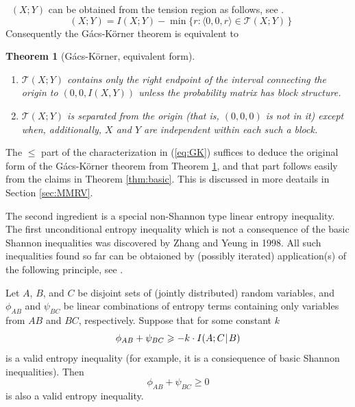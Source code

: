 \documentclass{IEEEtran}
\makeatletter
\def\correcthref{\hyper@anchor{\@currentHref}}
\newtheorem{theorem}{Theorem}
\newcommand\T{\mathcal{T}}
\DeclareMathOperator\GK{C_{\mathsf{GK}}}
\newcommand\I{I\xspace}
\def\|{\mkern 1.4mu\mathord{|}\mkern 1.4mu}
\renewcommand{\ge}{\geqslant}
\renewcommand{\le}{\leqslant}
\makeatother
\begin{document}
$\GK(X;Y)$ can be obtained from the tension region as follows, see
\cite[Corollary 3.3]{PP14}.
\begin{equation}\label{eq:GK}
  \GK(X;Y)=\I(X;Y) - \min\{ r: \langle 0,0,r\rangle \in\T(X;Y) \,\}
\end{equation}
Consequently the G\'acs-K\"orner theorem is equivalent to
\begin{theorem}[G\'acs-K\"orner, equivalent form]\correcthref\label{thm:alt}
\begin{enumerate}
\item $\T(X;Y)$
contains only the right endpoint of the interval connecting the origin to
$(0,0,\I(X,Y))$
unless the probability matrix has block structure.
\item $\T(X;Y)$
is separated from the origin (that is, $(0,0,0)$ is not in it) except when,
additionally, $X$ and $Y$ are independent within each such a block.
\end{enumerate}
\end{theorem}

The $\le$ part of the characterization in (\ref{eq:GK}) suffices to deduce
the original form of the G\'acs-K\"orner theorem from Theorem \ref{thm:alt},
and that part follows easily from the claims in Theorem \ref{thm:basic}.
This is discussed in more deatails in Section \ref{sec:MMRV}.

\smallskip

The second ingredient is a special non-Shannon type linear entropy
inequality. The first unconditional entropy inequality which is not a
consequence of the basic Shannon inequalities was discovered by Zhang and
Yeung \cite{ZhY.ineq} in 1998. All such inequalities found so far can be
obtaioned by (possibly iterated) application(s) of the following principle,
see \cite{tarik}.

Let $A$, $B$, and $C$ be disjoint sets of (jointly distributed) random
variables, and $\phi_{AB}$ and $\psi_{BC}$ be linear combinations of entropy
terms containing only variables from $AB$ and $BC$, respectively. Suppose
that for some constant $k$
\begin{equation}\label{eq:princ1}
    \phi_{AB} + \psi_{BC} \ge -k\cdot\I(A;C\|B)
\end{equation}
is a valid entropy inequality (for example, it is a consiequence of basic
Shannon inequalities). Then
\begin{equation}\label{eq:princ2}
   \phi_{AB} + \psi_{BC} \ge 0
\end{equation}
is also a valid entropy inequality.
\end{document}
